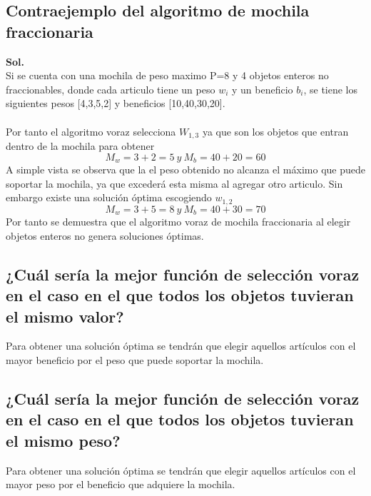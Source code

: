 \documentclass[12pt,twoside]{article}
\begin{document}
    \subsection{Contraejemplo del algoritmo de mochila fraccionaria}
        {\bf Sol.}\\
        Si se cuenta con una mochila de peso maximo P=8 y 4 objetos enteros no fraccionables, donde cada articulo tiene un peso $w_i$ y un beneficio $b_i$, se tiene los siguientes pesos [4,3,5,2] y beneficios [10,40,30,20].\\\\
        Por tanto el algoritmo voraz selecciona $W_{1,3}$ ya que son los objetos que entran dentro de la mochila para obtener
        $$M_w=3+2=5~y~M_b=40+20=60$$
        A simple vista se observa que la el peso obtenido no alcanza el m\'aximo que puede soportar la mochila, ya que exceder\'a esta misma al agregar otro articulo. Sin embargo existe una soluci\'on \'optima escogiendo $w_{1,2}$ 
        $$M_w=3+5=8~y~M_b=40+30=70$$
        Por tanto se demuestra que el algoritmo voraz de mochila fraccionaria al elegir objetos enteros no genera soluciones \'optimas.
            
    \subsection{¿Cu\'al sería la mejor funci\'on de selección voraz en el caso en el que todos los objetos tuvieran el mismo valor?}
        Para obtener una soluci\'on \'optima se tendr\'an que elegir aquellos art\'iculos con el mayor beneficio por el peso que puede soportar la mochila.
    
    \subsection{¿Cu\'al ser\'ia la mejor funci\'on de selecci\'on voraz en el caso en el que todos los objetos tuvieran el mismo peso?}
        Para obtener una soluci\'on \'optima se tendr\'an que elegir aquellos art\'iculos con el mayor peso por el beneficio que adquiere la mochila.
        
\end{document}
